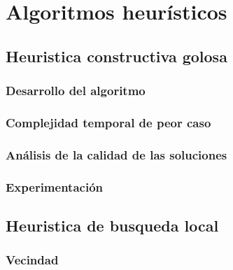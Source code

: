 \documentclass[a4paper, 10pt, twoside]{article}
\begin{document}
\section{Algoritmos heurísticos}
\label{sec:algoritmos-heuristicos}

  \subsection{Heuristica constructiva golosa}
  \label{sub:algoritmos-heuristicos-goloso}
      \subsubsection{Desarrollo del algoritmo}
      \label{subsub:algoritmos-heuristicos-goloso-desarrollo.tex}
      

      \subsubsection{Complejidad temporal de peor caso}
      \label{subsub:algoritmos-heuristicos-goloso-complejidad.tex}
      

      \subsubsection{Análisis de la calidad de las soluciones}
      \label{subsub:algoritmos-heuristicos-goloso-calidad.tex}
      

      \subsubsection{Experimentación}
      \label{subsub:algoritmos-heuristicos-goloso-experimentacion.tex}
      
  \newpage

  \subsection{Heuristica de busqueda local}
  \label{sub:algoritmos-heuristicos-busqueda}
      
      \label{subsub:algoritmos-heuristicos-busqueda-introduccion_busqueda.tex}
      
            
      \subsubsection{Vecindad}
      \label{subsub:algoritmos-heuristicos-busqueda-desarrollo_vecindad.tex}
      
\end{document}
